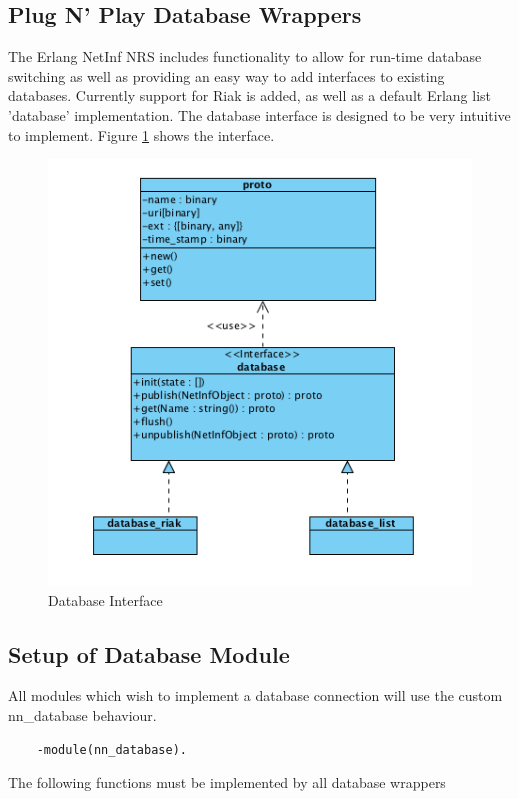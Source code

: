 \subsection {Plug N' Play Database Wrappers}

The Erlang NetInf NRS includes functionality to allow for run-time database switching as well as providing an easy way to add interfaces to existing databases. Currently support for Riak is added, as well as a default Erlang list 'database' implementation. The database interface is designed to be very intuitive to implement. Figure \ref{fig:dbfig} shows the interface.

\begin{figure}[h!]
	\centering
\centerline{\includegraphics{./img/database_api.png}}
\caption{Database Interface}
\label{fig:dbfig}
\end{figure}

\subsection {Setup of Database Module}

All modules which wish to implement a database connection will use the custom nn\_database behaviour.

\begin {verbatim}
    -module(nn_database).
\end{verbatim}

The following functions must be implemented by all database wrappers

